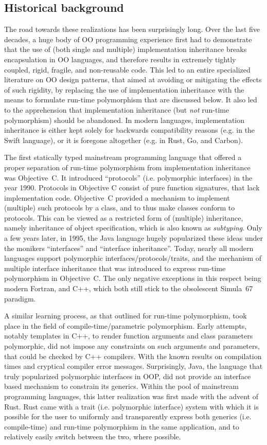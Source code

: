 \documentclass[11pt,oneside]{article}
\begin{document}
\subsection{Historical background}

The road towards these realizations has been surprisingly long. Over
the last five decades, a huge body of OO programming experience first
had to demonstrate that the use of (both single and multiple)
implementation inheritance breaks encapsulation in OO languages, and
therefore results in extremely tightly coupled, rigid, fragile, and
non-reusable code. This led to an entire specialized literature on OO
design patterns, that aimed at avoiding or mitigating the effects of
such rigidity, by replacing the use of implementation inheritance with
the means to formulate run-time polymorphism that are discussed
below. It also led to the apprehension that implementation inheritance
(but \emph{not} run-time polymorphism) should be abandoned. In modern
languages, implementation inheritance is either kept solely for
backwards compatibility reasons (e.g. in the Swift language), or it is
foregone altogether (e.g. in Rust, Go, and Carbon).

The first statically typed mainstream programming language that
offered a proper separation of run-time polymorphism from
implementation inheritance was Objective~C. It introduced
``protocols'' (i.e. polymorphic interfaces) in the year
1990. Protocols in Objective C consist of pure function signatures,
that lack implementation code. Objective~C provided a mechanism to
implement (multiple) such protocols by a class, and to thus make
classes conform to protocols. This can be viewed as a restricted form
of (multiple) inheritance, namely inheritance of object specification,
which is also known as \emph{subtyping}. Only a few years later, in
1995, the Java language hugely popularized these ideas under the
monikers ``interfaces'' and ``interface inheritance''. Today, nearly
all modern languages support polymorphic interfaces/protocols/traits,
and the mechanism of multiple interface inheritance that was
introduced to express run-time polymorphism in Objective~C. The only
negative exceptions in this respect being modern Fortran, and C++,
which both still stick to the obsolescent Simula~67 paradigm.

A similar learning process, as that outlined for run-time
polymorphism, took place in the field of compile-time/parametric
polymorphism. Early attempts, notably templates in C++, to render
function arguments and class parameters polymorphic, did not impose
any constraints on such arguments and parameters, that could be
checked by C++ compilers. With the known results on compilation times
and cryptical compiler error messages. Surprisingly, Java, the
language that truly popularized polymorphic interfaces in OOP, did not
provide an interface based mechanism to constrain its generics. Within
the pool of mainstream programming languages, this latter realization
was first made with the advent of Rust. Rust came with a trait
(i.e. polymorphic interface) system with which it is possible for the
user to uniformly and transparently express both generics
(i.e. compile-time) and run-time polymorphism in the same application,
and to relatively easily switch between the two, where possible.
\end{document}
